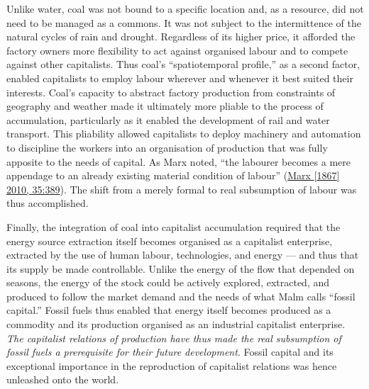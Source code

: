 \documentclass[a4paper, nobind]{templates/ociamthesis}
\begin{document}
Unlike water, coal was not bound to a specific location and, as a resource, did not need to be managed as a commons. It was not subject to the intermittence of the natural cycles of rain and drought. Regardless of its higher price, it afforded the factory owners more flexibility to act against organised labour and to compete against other capitalists. Thus coal's ``spatiotemporal profile,'' as a second factor, enabled capitalists to employ labour wherever and whenever it best suited their interests. Coal's capacity to abstract factory production from constraints of geography and weather made it ultimately more pliable to the process of accumulation, particularly as it enabled the development of rail and water transport. This pliability allowed capitalists to deploy machinery and automation to discipline the workers into an organisation of production that was fully apposite to the needs of capital. As Marx noted, ``the labourer becomes a mere appendage to an already existing material condition of labour'' (\protect\hyperlink{ref-marx_capital_1867}{Marx {[}1867{]} 2010, 35:389}). The shift from a merely formal to real subsumption of labour was thus accomplished.

Finally, the integration of coal into capitalist accumulation required that the energy source extraction itself becomes organised as a capitalist enterprise, extracted by the use of human labour, technologies, and energy --- and thus that its supply be made controllable. Unlike the energy of the flow that depended on seasons, the energy of the stock could be actively explored, extracted, and produced to follow the market demand and the needs of what Malm calls ``fossil capital.'' Fossil fuels thus enabled that energy itself becomes produced as a commodity and its production organised as an industrial capitalist enterprise. \emph{The capitalist relations of production have thus made the real subsumption of fossil fuels a prerequisite for their future development}. Fossil capital and its exceptional importance in the reproduction of capitalist relations was hence unleashed onto the world.
\end{document}
